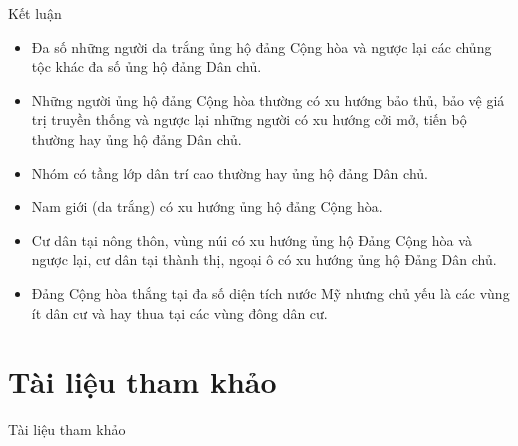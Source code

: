 \documentclass[10pt]{beamer}
\theoremstyle{remark}
\theoremstyle{definition}
\begin{document}
\begin{frame}{Kết luận}
	\begin{itemize}
        \item Đa số những người da trắng ủng hộ đảng Cộng hòa và ngược lại các chủng tộc khác đa số ủng hộ đảng Dân chủ.
        \item Những người ủng hộ đảng Cộng hòa thường có xu hướng bảo thủ, bảo vệ giá trị truyền thống và ngược lại những người có xu hướng cởi mở, tiến bộ thường hay ủng hộ đảng Dân chủ.
        \item Nhóm có tầng lớp dân trí cao thường hay ủng hộ đảng Dân chủ.
        \item Nam giới (da trắng) có xu hướng ủng hộ đảng Cộng hòa.
        \item Cư dân tại nông thôn, vùng núi có xu hướng ủng hộ Đảng Cộng hòa và ngược lại, cư dân tại thành thị, ngoại ô có xu hướng ủng hộ Đảng Dân chủ.
        \item Đảng Cộng hòa thắng tại đa số diện tích nước Mỹ nhưng chủ yếu là các vùng ít dân cư và hay thua tại các vùng đông dân cư.
    \end{itemize}
\end{frame}

\section{Tài liệu tham khảo}
\begin{frame}[allowframebreaks]{Tài liệu tham khảo}
    \printbibliography
\end{frame}
\end{document}

